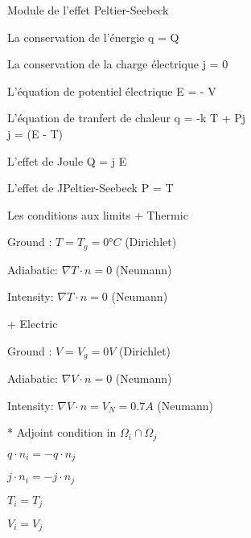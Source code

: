 \documentclass[11pt]{beamer}
\begin{document}
\begin{frame}{Module de l'effet Peltier-Seebeck}

\begin{block}{La conservation de l'énergie}
\nabla \cdot q = Q
\end{block}

\begin{block}{La conservation de la charge électrique}
\nabla \cdot j = 0
\end{block}

\begin{block}{L'équation de potentiel électrique}
E = - \nabla V
\end{block}

\begin{block}{L'équation de tranfert de chaleur}
q = -k \nabla T + Pj
\\
j = \sigma(E - \alpha \nabla T)
\end{block}

\begin{block}{L'effet de Joule}
Q = j \cdot E
\end{block}


\begin{block}{L'effet de JPeltier-Seebeck}
P = \alpha T
\end{block}

\end{frame}



\begin{frame}{Les conditions aux limits}
+ Thermic

Ground : $T = T_g = 0°C$ (Dirichlet)

Adiabatic: $\nabla T \cdot n = 0$ (Neumann)

Intensity: $\nabla T \cdot n = 0$ (Neumann)

+ Electric

Ground : $V = V_g = 0 V$ (Dirichlet)

Adiabatic: $\nabla V \cdot n = 0$ (Neumann)

Intensity: $\nabla V \cdot n = V_N = 0.7 A$ (Neumann)

* Adjoint condition in $\Omega_i \cap \Omega_j$

$q \cdot n_i = - q \cdot n_j$

$j \cdot n_i = - j \cdot n_j$

$T_i = T_j$

$V_i = V_j$
\end{frame}
\end{document}
